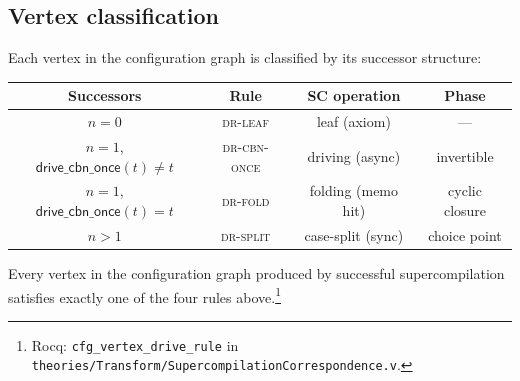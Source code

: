 \subsection{Vertex classification}
\label{sec:vertex-classification}

Each vertex in the configuration graph is classified by its successor structure:

\begin{center}
\small
\begin{tabular}{c|c|c|c}
\textbf{Successors} & \textbf{Rule} & \textbf{SC operation} & \textbf{Phase} \\
\hline
$n = 0$ & \textsc{dr-leaf} & leaf (axiom) & — \\
$n = 1$, $\mathsf{drive\_cbn\_once}(t) \neq t$ & \textsc{dr-cbn-once} & driving (async) & invertible \\
$n = 1$, $\mathsf{drive\_cbn\_once}(t) = t$ & \textsc{dr-fold} & folding (memo hit) & cyclic closure \\
$n > 1$ & \textsc{dr-split} & case-split (sync) & choice point \\
\end{tabular}
\end{center}

\begin{proposition}
\label{prop:vertex-class}
Every vertex in the configuration graph produced by successful supercompilation satisfies exactly one of the four rules above.\footnote{Rocq: \texttt{cfg\_vertex\_drive\_rule} in \texttt{theories/Transform/SupercompilationCorrespondence.v}.}
\end{proposition}


